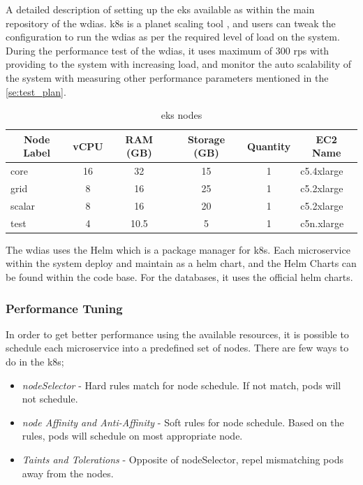 A detailed description of setting up the \acrshort{eks} available as \cite{KarunarathneWdias/Amazon_EKS.md:EKS} within the main repository of the \acrshort{wdias}.
\acrshort{k8s} is a planet scaling tool \cite{LinuxFoundationProduction-GradeKubernetes}, and users can tweak the configuration to run the \acrshort{wdias} as per the required level of load on the system. During the performance test of the \acrshort{wdias}, it uses maximum of 300 \acrshort{rps} with providing to the system with increasing load, and monitor the auto scalability of the system with measuring other performance parameters mentioned in the \ref{se:test_plan}.

\begin{table}[]
\begin{tabular}{lccccl}
\hline
\multicolumn{1}{c}{\textbf{Node Label}} & \textbf{vCPU} & \textbf{RAM (GB)} & \textbf{Storage (GB)} & \textbf{Quantity} & \multicolumn{1}{c}{\textbf{EC2 Name}} \\ \hline
core & 16 & 32 & 15 & 1 & c5.4xlarge \\
grid & 8 & 16 & 25 & 1 & c5.2xlarge \\
scalar & 8 & 16 & 20 & 1 & c5.2xlarge \\
test & 4 & 10.5 & 5 & 1 & c5n.xlarge \\ \hline
\end{tabular}
\caption{\acrshort{eks} nodes}
\label{tab:aws_eks_nodes}
\end{table}

The \acrshort{wdias} uses the Helm \cite{CNCFHelmDocs} which is a package manager for \acrshort{k8s}. Each microservice within the system deploy and maintain as a helm chart, and the Helm Charts \cite{KarunarathneWdias-helm-charts:Deployments} can be found within the code base. For the databases, it uses the official helm charts.

\subsubsection{Performance Tuning}
In order to get better performance using the available resources, it is possible to schedule each microservice into a predefined set of nodes. There are few ways to do in the \acrshort{k8s};
\begin{itemize}
    \item \emph{nodeSelector} - Hard rules match for node schedule. If not match, pods will not schedule.
    \item \emph{node Affinity and Anti-Affinity} - Soft rules for node schedule. Based on the rules, pods will schedule on most appropriate node.
    \item \emph{Taints and Tolerations} - Opposite of nodeSelector, repel mismatching pods away from the nodes.
\end{itemize}

